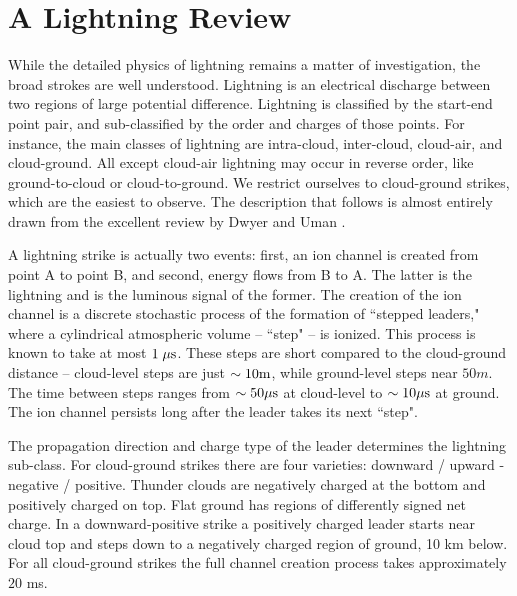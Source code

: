 \documentclass[%
reprint,
 amsmath,amssymb,
 aps,
 prd,
]{revtex4-2}
\begin{document}


\section{A Lightning Review} %
\label{sec:a_lightning_review}

    While the detailed physics of lightning remains a matter of investigation, the broad strokes are well understood. Lightning is an electrical discharge between two regions of large potential difference. Lightning is classified by the start-end point pair, and sub-classified by the order and charges of those points. For instance, the main classes of lightning are intra-cloud, inter-cloud, cloud-air, and cloud-ground. All except cloud-air lightning may occur in reverse order, like ground-to-cloud or cloud-to-ground. We restrict ourselves to cloud-ground strikes, which are the easiest to observe. The description that follows is almost entirely drawn from the excellent review by Dwyer and Uman \citep{DwyerUman2014}.

    A lightning strike is actually two events: first, an ion channel is created from point A to point B, and second, energy flows from B to A. The latter is the lightning and is the luminous signal of the former.  The creation of the ion channel is a discrete stochastic process of the formation of ``stepped leaders," where a cylindrical atmospheric volume -- ``step" -- is ionized. This process is known to take at most $1 \; \mu\rm{s}$. These steps are  short compared to the cloud-ground distance -- cloud-level steps  are just $\sim10 \rm{m}$, while ground-level steps near $50 m$. The time between steps ranges from  $\sim50 \mu\rm{s}$ at cloud-level to $\sim10 \mu\rm{s}$ at ground. The ion channel persists long after the leader takes its next ``step". 

    The propagation direction and charge type of the leader determines the lightning sub-class. For cloud-ground strikes there are four varieties: downward / upward - negative / positive. Thunder clouds are negatively charged at the bottom and positively charged on top. Flat ground has regions of differently signed net charge. In a downward-positive strike a positively charged leader starts near cloud top and steps down to a negatively charged region of ground, 10 km below. For all cloud-ground strikes the full channel creation process takes approximately $20$ ms.
\end{document}
